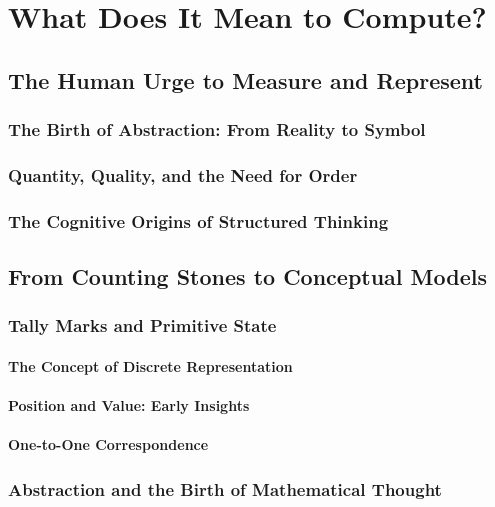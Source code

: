 \documentclass[12pt, oneside, openany]{book}
\begin{document}

\chapter{What Does It Mean to Compute?}

\section{The Human Urge to Measure and Represent}
\subsection{The Birth of Abstraction: From Reality to Symbol}
\subsection{Quantity, Quality, and the Need for Order}
\subsection{The Cognitive Origins of Structured Thinking}

\section{From Counting Stones to Conceptual Models}
\subsection{Tally Marks and Primitive State}
\subsubsection{The Concept of Discrete Representation}
\subsubsection{Position and Value: Early Insights}
\subsubsection{One-to-One Correspondence}

\subsection{Abstraction and the Birth of Mathematical Thought}
\end{document}
